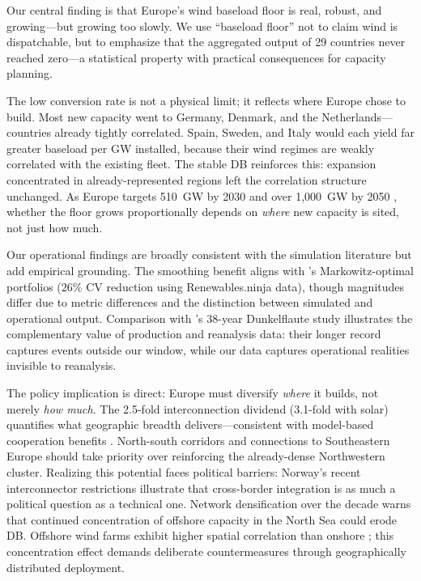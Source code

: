 \documentclass{article}
\begin{document}
Our central finding is that Europe's wind baseload floor is real, robust, and growing---but growing too slowly. We use ``baseload floor'' not to claim wind is dispatchable, but to emphasize that the aggregated output of 29 countries never reached zero---a statistical property with practical consequences for capacity planning.

The low conversion rate is not a physical limit; it reflects where Europe chose to build. Most new capacity went to Germany, Denmark, and the Netherlands---countries already tightly correlated. Spain, Sweden, and Italy would each yield far greater baseload per GW installed, because their wind regimes are weakly correlated with the existing fleet. The stable DB reinforces this: expansion concentrated in already-represented regions left the correlation structure unchanged. As Europe targets 510~GW by 2030 and over 1,000~GW by 2050 \citep{windeurope2024}, whether the floor grows proportionally depends on \textit{where} new capacity is sited, not just how much.

Our operational findings are broadly consistent with the simulation literature but add empirical grounding. The smoothing benefit aligns with \citet{lopezprol2024}'s Markowitz-optimal portfolios (26\% CV reduction using Renewables.ninja data), though magnitudes differ due to metric differences and the distinction between simulated and operational output. Comparison with \citet{kittel2026}'s 38-year Dunkelflaute study illustrates the complementary value of production and reanalysis data: their longer record captures events outside our window, while our data captures operational realities invisible to reanalysis.

The policy implication is direct: Europe must diversify \textit{where} it builds, not merely \textit{how much}. The 2.5-fold interconnection dividend (3.1-fold with solar) quantifies what geographic breadth delivers---consistent with model-based cooperation benefits \citep{schlachtberger2017,rodriguez2014}. North-south corridors and connections to Southeastern Europe should take priority over reinforcing the already-dense Northwestern cluster. Realizing this potential faces political barriers: Norway's recent interconnector restrictions illustrate that cross-border integration is as much a political question as a technical one. Network densification over the decade warns that continued concentration of offshore capacity in the North Sea could erode DB. Offshore wind farms exhibit higher spatial correlation than onshore \citep{kempton2010,potisomporn2022,hjelmeland2023}; this concentration effect demands deliberate countermeasures through geographically distributed deployment.
\end{document}
